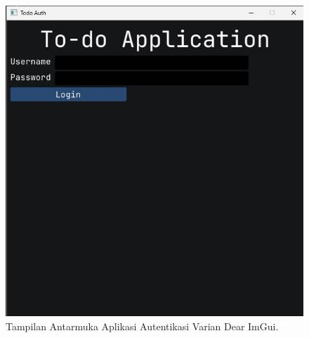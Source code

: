\begin{enumerate}
\begin{figure}[H]
	          \includegraphics[height=0.5\textheight]{assets/pics/imgui_app.jpeg} %
	          \caption{Tampilan Antarmuka Aplikasi Autentikasi Varian Dear ImGui.}
	          \label{fig:imgui_app_ui}
	      \end{figure}
\end{enumerate}

